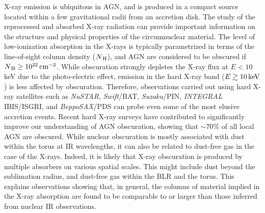 \documentclass{natureprintstyle}
\begin{document}




{X-ray emission is ubiquitous in AGN, and is produced in a compact source located within a few gravitational radii\cite{Zoghbi:2012jk} from an accretion disk.} The study of the reprocessed and absorbed X-ray radiation can provide important information on the structure and physical properties of the circumnuclear material. 
{The level of low-ionization absorption in the X-rays} is typically parametrized in terms of the line-of-sight column density ($N_{\rm\,H}$), and AGN are considered to be obscured if $N_{\rm\,H}\geq 10^{22}\rm\,cm^{-2}$. While obscuration strongly depletes the X-ray flux at $E<10$\,keV due to the photo-electric effect, emission in the hard X-ray band ($E\gtrsim10\rm\,keV$) is less affected by obscuration. {Therefore, observations carried out using hard X-ray satellites such as {\it NuSTAR}, {\it Swift}/BAT, {\it Suzaku}/PIN, {\it INTEGRAL} IBIS/ISGRI, and {\it BeppoSAX}/PDS can probe even some of the most elusive accretion events.} Recent hard X-ray surveys have {contributed to} significantly improve our understanding of AGN obscuration, {showing that $\sim 70\%$ of all local AGN are obscured\cite{Burlon:2011dk,Ricci:2015tg}}. {While nuclear obscuration is mostly associated with dust within the torus at IR wavelengths, it can also be related to dust-free gas in the case of the X-rays.} Indeed, it is likely that X-ray obscuration is produced by multiple absorbers on various spatial scales. {This might include dust beyond the sublimation radius, and dust-free gas within the BLR and the torus\cite{Risaliti07,Maiolino:2010fu}}. This explains observations showing that, in general, the columns of material implied in the X-ray absorption are found to be comparable to or larger than those inferred from nuclear IR observations\cite{Ramos09,Burtscher16}. 
\end{document}
